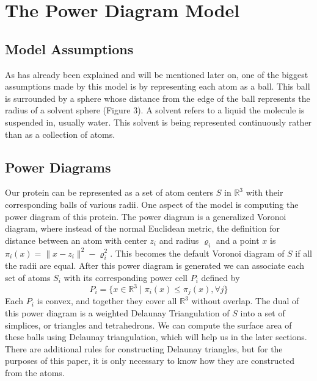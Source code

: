 \documentclass{article}
\newcommand{\R}{\mathbb{R}}
\begin{document}
\section{The Power Diagram Model}
\subsection{Model Assumptions}
As has already been explained and will be mentioned later on, one of the biggest assumptions made by this model is by representing each atom as a ball. This ball is surrounded by a sphere whose distance from the edge of the ball represents the radius of a solvent sphere (Figure 3). A solvent refers to a liquid the molecule is suspended in, usually water. This solvent is being represented continuously rather than as a collection of atoms.
\subsection{Power Diagrams}

Our protein can be represented as a set of atom centers $S$ in $\R^3$ with their corresponding balls of various radii. One aspect of the model is computing the power diagram of this protein. The power diagram is a generalized Voronoi diagram, where instead of the normal Euclidean metric, the definition for distance between an atom with center $z_i$ and radius $\varrho_i$ and a point $x$ is $\pi_i(x)=\|x-z_i\|^2-\varrho_i^2$. This becomes the default Voronoi diagram of $S$ if all the radii are equal. After this power diagram is generated we can associate each set of atoms $S_i$ with its corresponding power cell $P_i$ defined by
\begin{equation*}
P_i=\{x\in\R^3\mid\pi_i(x)\leq\pi_j(x),\forall j\}
\end{equation*}
Each $P_i$ is convex, and together they cover all $\R^3$ without overlap. The dual of this power diagram is a weighted Delaunay Triangulation of $S$ into a set of simplices, or triangles and tetrahedrons. We can compute the surface area of these balls using Delaunay triangulation, which will help us in the later sections. There are additional rules for constructing Delaunay triangles, but for the purposes of this paper, it is only necessary to know how they are constructed from the atoms. 

\end{document}
